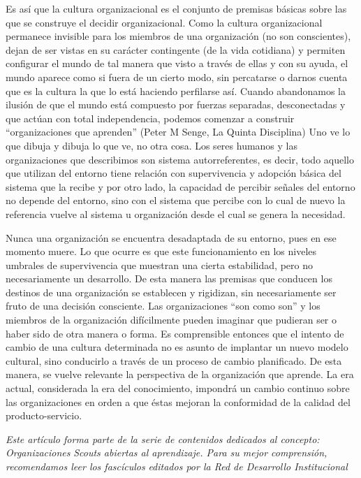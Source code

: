 Es así que la cultura organizacional es el conjunto de premisas básicas sobre las que se construye el decidir organizacional. Como la cultura organizacional permanece invisible para los miembros de una organización (no son conscientes), dejan de ser vistas en su carácter contingente (de la vida cotidiana) y permiten configurar el mundo de tal manera que visto a través de ellas y con su ayuda, el mundo aparece como si fuera de un cierto modo, sin percatarse o darnos cuenta que es la cultura la que lo está haciendo perfilarse así. Cuando abandonamos la ilusión de que el mundo está compuesto por fuerzas separadas, desconectadas y que actúan con total independencia, podemos comenzar a construir “organizaciones que aprenden” (Peter M Senge, La Quinta Disciplina) Uno ve lo que dibuja y dibuja lo que ve, no otra cosa. Los seres humanos y las organizaciones que describimos son sistema autorreferentes, es decir, todo aquello que utilizan del entorno tiene relación con supervivencia y adopción básica del sistema que la recibe y por otro lado, la capacidad de percibir señales del entorno no depende del entorno, sino con el sistema que percibe con lo cual de nuevo la referencia vuelve al sistema u organización desde el cual se genera la necesidad.



Nunca una organización se encuentra desadaptada de su entorno, pues en ese momento muere. Lo que ocurre es que este funcionamiento en los niveles umbrales de supervivencia que muestran una cierta estabilidad, pero no necesariamente un desarrollo. De esta manera las premisas que conducen los destinos de una organización se establecen y rigidizan, sin necesariamente ser fruto de una decisión consciente. Las organizaciones “son como son” y los miembros de la organización difícilmente pueden imaginar que pudieran ser o haber sido de otra manera o forma. Es comprensible entonces que el intento de cambio de una cultura determinada no es asunto de implantar un nuevo modelo cultural, sino conducirlo a través de un proceso de cambio planificado. De esta manera, se vuelve relevante la perspectiva de la organización que aprende. La era actual, considerada la era del conocimiento, impondrá un cambio continuo sobre las organizaciones en orden a que éstas mejoran la conformidad de la calidad del producto-servicio.

\textit{Este artículo forma parte de la serie de contenidos dedicados al concepto: Organizaciones} \textit{Scouts abiertas al aprendizaje. Para su mejor comprensión, recomendamos leer los fascículos} \textit{editados por la Red de Desarrollo Institucional}

